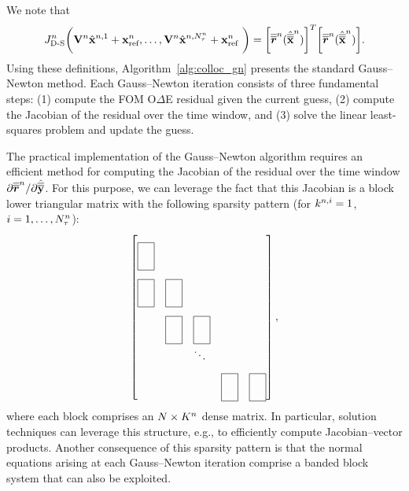 We note that
\begin{equation*}
J^{n}_{\text{D-S}} \bigg( \mathbf {V}^{n} \hat{\mathbf{x}}^{n,1} + \mathbf{x}_\text{ref}^{n},\ldots,\mathbf {V}^{n} \hat{\mathbf{x}}^{n,N_{\tau}^{n}} + \mathbf{x}_\text{ref}^{n} \ \bigg) 
=
\bigg[\overline{\overline{\boldsymbol r}}^{n}_{\text{}}  (\hat{\overline{\overline{\mathbf {x}}}}^{n}) \bigg]^T \bigg[ \overline{\overline{\boldsymbol r}}^{n}_{\text{}}(\hat{\overline{\overline{\mathbf {x}}}}^{n}) \bigg].
\end{equation*} 
Using these definitions, Algorithm~\ref{alg:colloc_gn} presents the standard
Gauss--Newton method. Each Gauss--Newton iteration consists of three fundamental steps: (1)
compute the FOM O$\Delta$E residual given the current guess, (2) compute the
Jacobian of the residual over the time window, and (3) solve the linear least-squares problem and update the guess. 

The practical implementation of the Gauss--Newton algorithm requires an
efficient method for computing the Jacobian of the residual over the time
window
${\partial \overline{\overline{\boldsymbol r}}^{n}_{\text{}}}/{\partial \hat{\overline{\overline{\mathbf{y}}}}^{}}$.
For this purpose, we can leverage the fact that this Jacobian is a block lower
triangular matrix with the following sparsity pattern (for $k^{n,i} = 1$,
$i=1,\ldots,N_{\tau}^{n}$): 
\begin{equation*} \begin{bmatrix*}[l]
\matshapea & \\%
 \matshapea & \matshapea & \\%
 & \matshapea  & \matshapea & \\%
&  & \ddots & \\%
 & &  & \matshapea &  \matshapea 
\end{bmatrix*},
\end{equation*}
where each block comprises an $N \times K^{n}$ dense matrix.
In particular, solution techniques can leverage this structure, e.g., to
efficiently compute Jacobian--vector products.
Another consequence of this sparsity pattern is that the normal equations
arising at each Gauss--Newton iteration 
comprise a banded block system that can also be exploited.

